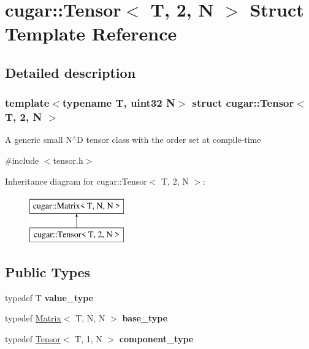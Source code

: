 \hypertarget{structcugar_1_1_tensor_3_01_t_00_012_00_01_n_01_4}{}\section{cugar\+:\+:Tensor$<$ T, 2, N $>$ Struct Template Reference}
\label{structcugar_1_1_tensor_3_01_t_00_012_00_01_n_01_4}


\subsection{Detailed description}
\subsubsection*{template$<$typename T, uint32 N$>$\newline
struct cugar\+::\+Tensor$<$ T, 2, N $>$}

A generic small N$^\wedge$D tensor class with the order set at compile-\/time 

{\ttfamily \#include $<$tensor.\+h$>$}

Inheritance diagram for cugar\+:\+:Tensor$<$ T, 2, N $>$\+:\begin{figure}[H]
\begin{center}
\leavevmode
\includegraphics[height=2.000000cm]{structcugar_1_1_tensor_3_01_t_00_012_00_01_n_01_4}
\end{center}
\end{figure}
\subsection*{Public Types}
\begin{DoxyCompactItemize}
\item 
\mbox{\label{structcugar_1_1_tensor_3_01_t_00_012_00_01_n_01_4_ae7954c547cfd6dd14158d281ee5abb0b}} 
typedef T {\bfseries value\+\_\+type}
\item 
\mbox{\label{structcugar_1_1_tensor_3_01_t_00_012_00_01_n_01_4_a804adc57eaef3a8452048148df22e505}} 
typedef \hyperlink{structcugar_1_1_matrix}{Matrix}$<$ T, N, N $>$ {\bfseries base\+\_\+type}
\item 
\mbox{\label{structcugar_1_1_tensor_3_01_t_00_012_00_01_n_01_4_aaec2bba57c97bcac82b8bfc068dbd0cb}} 
typedef \hyperlink{structcugar_1_1_tensor}{Tensor}$<$ T, 1, N $>$ {\bfseries component\+\_\+type}
\end{DoxyCompactItemize}
